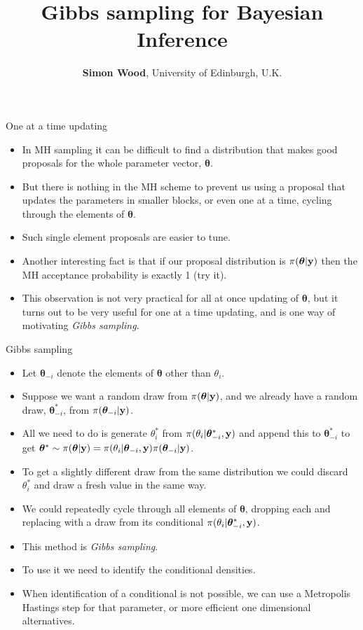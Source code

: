 \documentclass{beamer}
\title{Gibbs sampling for Bayesian Inference}
\author{{\bf Simon Wood}, University of Edinburgh, U.K.}
\date{}
\begin{document}
\begin{frame}
\titlepage
\end{frame}

\begin{frame}{One at a time updating}
\begin{itemize}
\item In MH sampling it can be difficult to find a distribution that makes good proposals for the whole parameter vector, $\bm \theta$.
\item But there is nothing in the MH scheme to prevent us using a proposal that updates the parameters in smaller blocks, or even one at a time, cycling through the elements of $\bm \theta$.
\item Such single element proposals are easier to tune.
\item Another interesting fact is that if our proposal distribution is $\pi({\bm \theta}|{\bf y})$ then the MH acceptance probability is exactly 1 (try it).
\item This observation is not very practical for all at once updating of $\bm\theta$, but it turns out to be very useful for one at a time updating, and is one way of motivating {\em Gibbs sampling}.  
\end{itemize}
\end{frame}

\begin{frame}{Gibbs sampling}
\begin{itemize}
\item Let ${\bm \theta}_{-i}$ denote the elements of $\bm \theta$ other than $\theta_i$.
\item Suppose we want a random draw from $\pi({\bm \theta}|{\bf y})$, and we already have a random draw, ${\bm \theta}_{-i}^*$, from $\pi({\bm \theta}_{-i}|{\bf y})$. 
\item All we need to do is generate $\theta_i^*$ from $\pi(\theta_i|{\bm \theta}_{-i}^*,{\bf y})$ and append this to ${\bm \theta}_{-i}^*$ to get ${\bm \theta}^* \sim \pi({\bm \theta}|{\bf y}) = \pi(\theta_i|{\bm \theta}_{-i},{\bf y})\pi({\bm \theta}_{-i}|{\bf y})$.
\item To get a slightly different draw from the same distribution we could discard $\theta_i^*$ and draw a fresh value in the same way.
\item We could repeatedly cycle through all elements of $\bm \theta$, dropping each and replacing with a draw from its conditional $\pi(\theta_i|{\bm \theta}_{-i}^*,{\bf y})$. 
\item This method is {\em Gibbs sampling}.
\item To use it we need to identify the conditional densities. 
\item When identification of a conditional is not possible, we can use a Metropolis Hastings step for that parameter, or more efficient one dimensional alternatives.
\end{itemize}
\end{frame}
\end{document}
